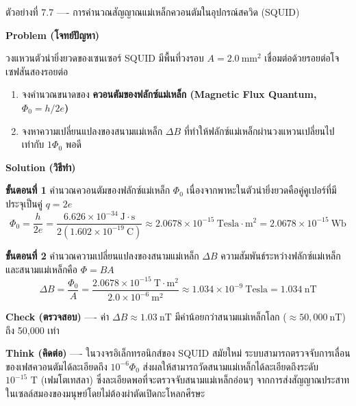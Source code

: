 \begin{psctbox}{ตัวอย่างที่ 7.7 ---- การคำนวณสัญญาณแม่เหล็กควอนตัมในอุปกรณ์สควิด (SQUID)}

\textbf{Problem (โจทย์ปัญหา)}

วงแหวนตัวนำยิ่งยวดของเซนเซอร์ SQUID มีพื้นที่วงรอบ $A = 2.0~\text{mm}^2$ เชื่อมต่อด้วยรอยต่อโจเซฟสันสองรอยต่อ
\begin{enumerate}
    \item จงคำนวณขนาดของ \textbf{ควอนตัมของฟลักซ์แม่เหล็ก (Magnetic Flux Quantum, $\Phi_0 = h/2e$)}
    \item จงหาความเปลี่ยนแปลงของสนามแม่เหล็ก $\Delta B$ ที่ทำให้ฟลักซ์แม่เหล็กผ่านวงแหวนเปลี่ยนไปเท่ากับ $1 \Phi_0$ พอดี
\end{enumerate}

\textbf{Solution (วิธีทำ)}

\textbf{ขั้นตอนที่ 1} คำนวณควอนตัมของฟลักซ์แม่เหล็ก $\Phi_0$
เนื่องจากพาหะในตัวนำยิ่งยวดคือคู่คูเปอร์ที่มีประจุเป็นคู่ $q = 2e$
\begin{equation*}
\Phi_0 = \frac{h}{2e} = \frac{6.626 \times 10^{-34}~\text{J}\cdot\text{s}}{2(1.602 \times 10^{-19}~\text{C})} \approx 2.0678 \times 10^{-15}~\text{Tesla}\cdot\text{m}^2 = 2.0678 \times 10^{-15}~\text{Wb}
\end{equation*}

\textbf{ขั้นตอนที่ 2} คำนวณความเปลี่ยนแปลงของสนามแม่เหล็ก $\Delta B$
ความสัมพันธ์ระหว่างฟลักซ์แม่เหล็กและสนามแม่เหล็กคือ $\Phi = B A$
\begin{equation*}
\Delta B = \frac{\Phi_0}{A} = \frac{2.0678 \times 10^{-15}~\text{T}\cdot\text{m}^2}{2.0 \times 10^{-6}~\text{m}^2} \approx 1.034 \times 10^{-9}~\text{Tesla} = 1.034~\text{nT}
\end{equation*}

\textbf{Check (ตรวจสอบ)} ---- ค่า $\Delta B \approx 1.03~\text{nT}$ มีค่าน้อยกว่าสนามแม่เหล็กโลก ($\approx 50,000~\text{nT}$) ถึง 50,000 เท่า

\textbf{Think (คิดต่อ)} ---- ในวงจรอิเล็กทรอนิกส์ของ SQUID สมัยใหม่ ระบบสามารถตรวจจับการเลื่อนของเฟสควอนตัมได้ละเอียดถึง $10^{-6} \Phi_0$ ส่งผลให้สามารถวัดสนามแม่เหล็กได้ละเอียดถึงระดับ $10^{-15}\text{ T}$ (เฟมโตเทสลา) ซึ่งละเอียดพอที่จะตรวจจับสนามแม่เหล็กอ่อนๆ จากการส่งสัญญาณประสาทในเซลล์สมองของมนุษย์โดยไม่ต้องผ่าตัดเปิดกะโหลกศีรษะ
\end{psctbox}

